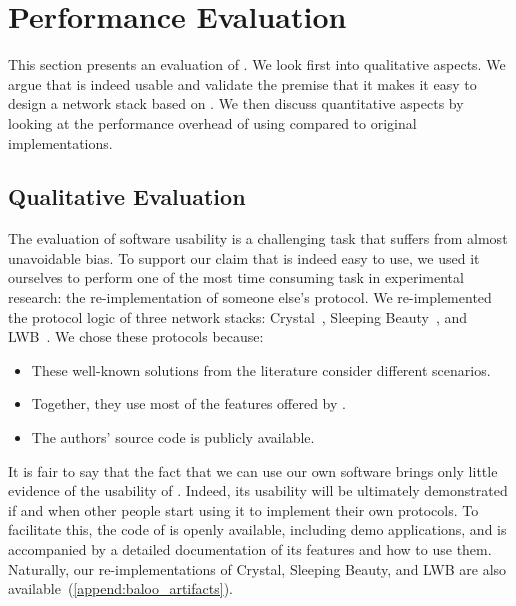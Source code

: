 
\section{Performance Evaluation}
\label{sec:baloo_eval}

This section presents an evaluation of \baloo.
We look first into qualitative aspects. We argue that \baloo is indeed usable and validate the premise that it makes it easy to design a network stack based on \ST.
We then discuss quantitative aspects by looking at the performance overhead of using \baloo compared to original implementations.

\subsection{Qualitative Evaluation}
\label{subsec:usability}

The evaluation of software usability is a challenging task that suffers from almost unavoidable bias.
To support our claim that \baloo is indeed easy to use, we used it ourselves to perform one of the most time consuming task in experimental research: the re-implementation of someone else's protocol.
We re-implemented the protocol logic of three network stacks: Crystal~\cite{istomin2018Interferenceresilient}, Sleeping Beauty~\cite{sarkar2016Sleeping}, and LWB~\cite{ferrari2012LWB}. We chose these protocols because:
\begin{itemize}[nosep]

	\item These well-known solutions from the literature consider different scenarios.

	\item Together, they use most of the features offered by \baloo.

	\item The authors' source code is publicly available.

\end{itemize}


It is fair to say that the fact that {we} can use {our} own software brings only little evidence of the usability of \baloo.
Indeed, its usability will be ultimately demonstrated if and when other people start using it to implement their own protocols.
To facilitate this, the code of \baloo is openly available, including demo applications, and is accompanied by a detailed documentation of its features and how to use them.
Naturally, our re-implementations of Crystal, Sleeping Beauty, and LWB are also available~(\cref{append:baloo_artifacts}).

